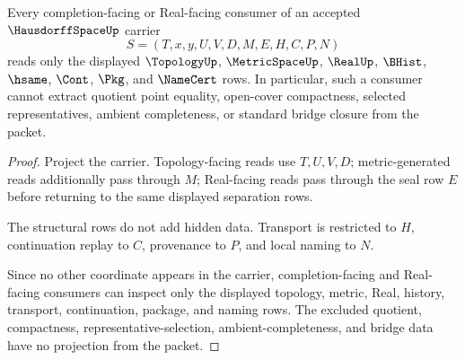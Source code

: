 \begin{theorem}
\label{thm:hausdorff-space-realseal-nonescape}
Every completion-facing or Real-facing consumer of an accepted $\HausdorffSpaceUp$ carrier
$$
S=(T,x,y,U,V,D,M,E,H,C,P,N)
$$
reads only the displayed $\TopologyUp$, $\MetricSpaceUp$, $\RealUp$, $\BHist$, $\hsame$, $\Cont$, $\Pkg$, and $\NameCert$ rows. In particular, such a consumer cannot extract quotient point equality, open-cover compactness, selected representatives, ambient completeness, or standard bridge closure from the packet.
\end{theorem}
\begin{proof}
Project the carrier. Topology-facing reads use $T,U,V,D$; metric-generated reads additionally pass through $M$; Real-facing reads pass through the seal row $E$ before returning to the same displayed separation rows.

The structural rows do not add hidden data. Transport is restricted to $H$, continuation replay to $C$, provenance to $P$, and local naming to $N$.

Since no other coordinate appears in the carrier, completion-facing and Real-facing consumers can inspect only the displayed topology, metric, Real, history, transport, continuation, package, and naming rows. The excluded quotient, compactness, representative-selection, ambient-completeness, and bridge data have no projection from the packet.
\end{proof}

